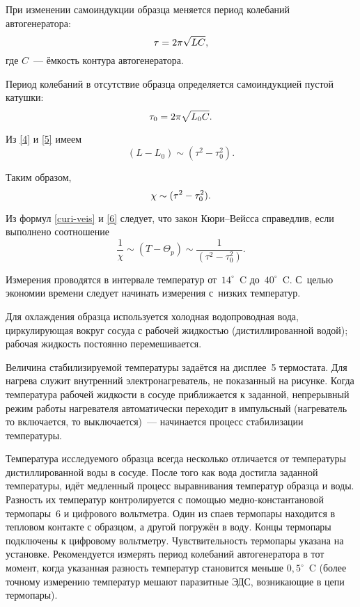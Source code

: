 При изменении самоиндукции образца меняется период колебаний автогенератора:
\begin{equation}%
	\tau=2\pi\sqrt{LC},
	\eqmark{4}
\end{equation}
где $C$~--- ёмкость контура автогенератора.

Период колебаний в отсутствие образца определяется самоиндукцией пустой катушки:
\begin{equation}%
	\tau_0=2\pi\sqrt{L_0 C}.
	\eqmark{5}
\end{equation}

Из \eqref{4} и \eqref{5} имеем
\begin{equation*}
	(L-L_0)\sim (\tau^2-\tau_0^2).
\end{equation*}

Таким образом,
\begin{equation}%
	\eqmark{6}
	\chi\sim (\tau^2-\tau_0^2).
\end{equation}

Из формул \eqref{curi-veis} и \eqref{6} следует, что закон Кюри--Вейсса справедлив, если выполнено соотношение
\begin{equation}
	\frac{1}{\chi}\sim(T-\Theta_p)\sim\frac{1}{(\tau^2-\tau_0^2)}.
\end{equation}

Измерения проводятся в интервале температур от~$14^\circ$~C до~$40^\circ$~C. С~целью экономии времени следует начинать измерения
с~низких температур.

Для охлаждения образца используется холодная водопроводная вода, циркулирующая вокруг сосуда с рабочей жидкостью
(дистиллированной водой); рабочая жидкость постоянно перемешивается.

Величина стабилизируемой температуры задаётся на дисплее~5 термостата. Для нагрева служит внутренний электронагреватель,
не показанный на рисунке. Когда температура рабочей жидкости в сосуде приближается к заданной, непрерывный режим работы
нагревателя автоматически переходит в импульсный (нагреватель то включается, то выключается)~--- начинается процесс
стабилизации температуры.

Температура исследуемого образца всегда несколько отличается от температуры дистиллированной воды в сосуде. После того
как вода достигла заданной температуры, идёт медленный процесс выравнивания температур образца и воды. Разность их
температур контролируется с помощью медно-константановой термопары~6 и цифрового вольтметра. Один из спаев термопары
находится в тепловом контакте с образцом, а другой погружён в воду. Концы термопары подключены к цифровому вольтметру.
Чувствительность термопары указана на установке. Рекомендуется измерять период колебаний автогенератора в тот момент,
когда указанная разность температур становится меньше $0,5^\circ$~C (более точному измерению температур мешают паразитные ЭДС,
возникающие в цепи термопары).

